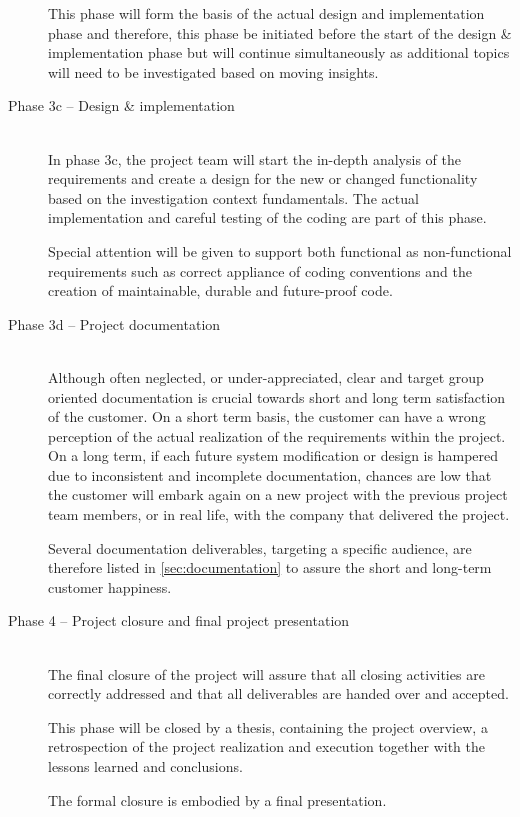 \begin{description}
		This phase will form the basis of the actual design and implementation phase and therefore, this phase be initiated before the start of the design \& implementation phase but will continue simultaneously as additional  topics will need to be investigated based on moving insights. 

 	\item [Phase 3c -- Design \& implementation]~\\
	In phase 3c, the project team will start the in-depth analysis of the requirements and create a design for the new or changed functionality based on the investigation context fundamentals.
	The actual implementation and careful testing of the coding are part of this phase. 

	Special attention will be given to support both functional as non-functional requirements such as correct appliance of coding conventions and the creation of maintainable, durable and future-proof code.

 	\item [Phase 3d -- Project documentation]~\\
	Although often neglected, or under-appreciated, clear and target group oriented documentation is crucial towards short and long term satisfaction of the customer.
	On a short term basis, the customer can have a wrong perception of the actual realization of the requirements within the project. On a long term, if each future system modification or design is hampered due to inconsistent and incomplete documentation, chances are low that the customer will embark again on a new project with the previous project team members, or in real life, with the company that delivered the project.

	Several documentation deliverables, targeting a specific audience, are therefore listed in \autoref{sec:documentation} to assure the short and long-term customer happiness.

	\item [Phase 4 -- Project closure and final project presentation]~\\
	The final closure of the project will assure that all closing activities are correctly addressed and that all deliverables are handed over and accepted.

	This phase will be closed by a thesis, containing the project overview, a retrospection of the project realization and execution together with the lessons learned and conclusions.

	The formal closure is embodied by a final presentation.
\end {description}

